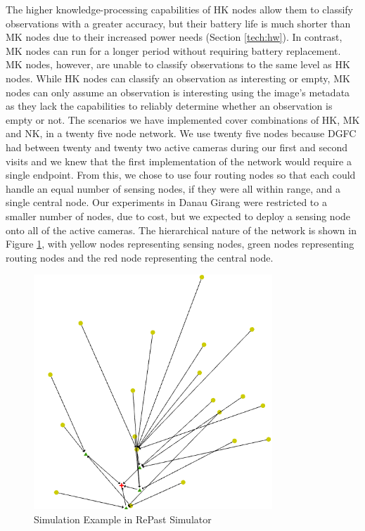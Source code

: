 The higher knowledge-processing capabilities of HK nodes allow them to classify observations with a greater accuracy, but their battery life is much shorter than MK nodes due to their increased power needs (Section \ref{tech:hw}). In contrast, MK nodes can run for a longer period without requiring battery replacement. MK nodes, however, are unable to classify observations to the same level as HK nodes. While HK nodes can classify an observation as interesting or empty, MK nodes can only assume an observation is interesting using the image's metadata as they lack the capabilities to reliably determine whether an observation is empty or not. The scenarios we have implemented cover combinations of HK, MK and NK, in a twenty five node network. We use twenty five nodes because DGFC had between twenty and twenty two active cameras during our first and second visits and we knew that the first implementation of the network would require a single endpoint. From this, we chose to use four routing nodes so that each could handle an equal number of sensing nodes, if they were all within range, and a single central node. Our experiments in Danau Girang were restricted to a smaller number of nodes, due to cost, but we expected to deploy a sensing node onto all of the active cameras. The hierarchical nature of the network is shown in Figure \ref{fig:sim}, with yellow nodes representing sensing nodes, green nodes representing routing nodes and the red node representing the central node.

	\begin{figure}[h]
	\centering
	\includegraphics[width=0.8\textwidth]{Chap7/figures/khas_sim}
	\caption{Simulation Example in RePast Simulator}
	\label{fig:sim}
	\end{figure}


